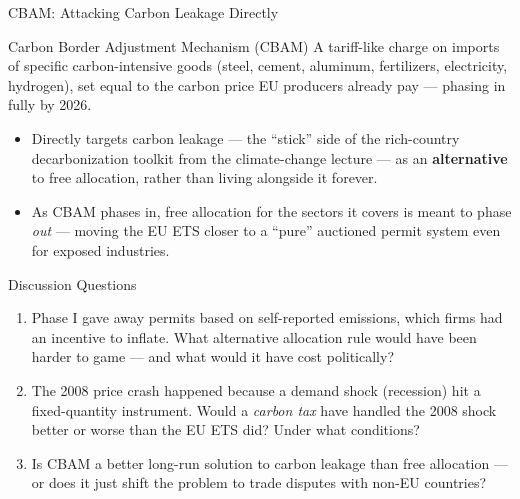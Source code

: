 \documentclass[11pt,aspectratio=169]{beamer}
\begin{document}
\begin{frame}{CBAM: Attacking Carbon Leakage Directly}
  \begin{block}{Carbon Border Adjustment Mechanism (CBAM)}
    A tariff-like charge on imports of specific carbon-intensive goods (steel, cement, aluminum, fertilizers, electricity, hydrogen), set equal to the carbon price EU producers already pay --- phasing in fully by 2026.
  \end{block}
  \begin{itemize}
    \item Directly targets carbon leakage --- the ``stick'' side of the rich-country decarbonization toolkit from the climate-change lecture --- as an \textbf{alternative} to free allocation, rather than living alongside it forever.
    \item As CBAM phases in, free allocation for the sectors it covers is meant to phase \emph{out} --- moving the EU ETS closer to a ``pure'' auctioned permit system even for exposed industries.
  \end{itemize}
\end{frame}

\begin{frame}{Discussion Questions}
  \begin{enumerate}
    \setlength{\itemsep}{8pt}
    \item Phase I gave away permits based on self-reported emissions, which firms had an incentive to inflate. What alternative allocation rule would have been harder to game --- and what would it have cost politically?
    \item The 2008 price crash happened because a demand shock (recession) hit a fixed-quantity instrument. Would a \emph{carbon tax} have handled the 2008 shock better or worse than the EU ETS did? Under what conditions?
    \item Is CBAM a better long-run solution to carbon leakage than free allocation --- or does it just shift the problem to trade disputes with non-EU countries?
  \end{enumerate}
\end{frame}
\end{document}
